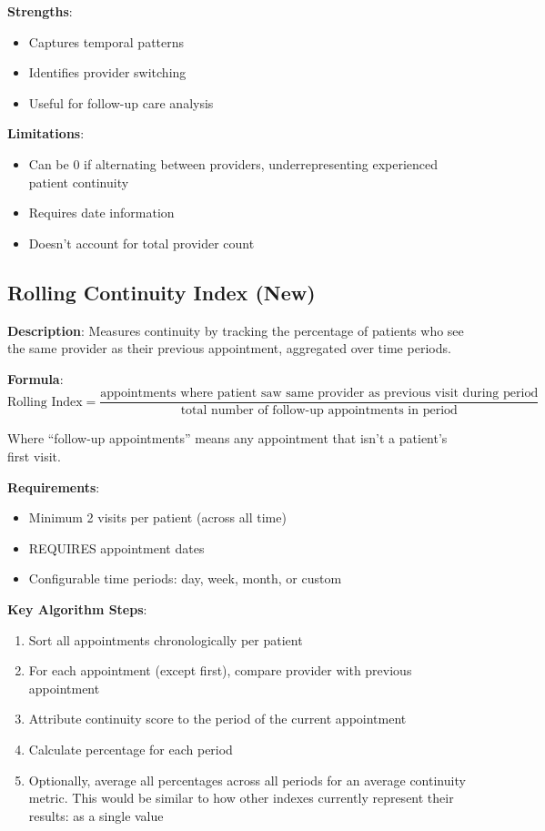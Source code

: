 \documentclass[11pt,a4paper]{article}
\begin{document}
\textbf{Strengths}:
\begin{itemize}
\item Captures temporal patterns
\item Identifies provider switching
\item Useful for follow-up care analysis
\end{itemize}

\textbf{Limitations}:
\begin{itemize}
\item Can be 0 if alternating between providers, underrepresenting experienced patient continuity
\item Requires date information
\item Doesn't account for total provider count
\end{itemize}

\subsection{Rolling Continuity Index (New)}

\textbf{Description}: Measures continuity by tracking the percentage of patients who see the same provider as their previous appointment, aggregated over time periods.

\textbf{Formula}:
\begin{equation}
\text{Rolling Index} = \frac{\text{appointments where patient saw same provider as previous visit during period}}{\text{total number of follow-up appointments in period}}
\end{equation}

Where ``follow-up appointments'' means any appointment that isn't a patient's first visit.

\textbf{Requirements}:
\begin{itemize}
\item Minimum 2 visits per patient (across all time)
\item REQUIRES appointment dates
\item Configurable time periods: day, week, month, or custom
\end{itemize}

\textbf{Key Algorithm Steps}:
\begin{enumerate}
\item Sort all appointments chronologically per patient
\item For each appointment (except first), compare provider with previous appointment
\item Attribute continuity score to the period of the current appointment
\item Calculate percentage for each period
\item Optionally, average all percentages across all periods for an average continuity metric. This would be similar to how other indexes currently represent their results: as a single value
\end{enumerate}
\end{document}

